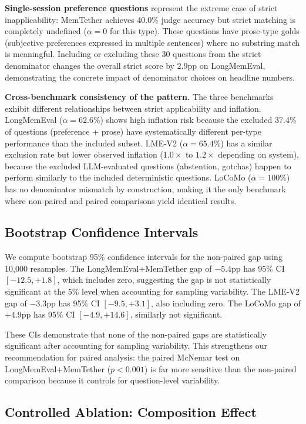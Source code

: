 \documentclass[10pt]{article}
\begin{document}
\textbf{Single-session preference questions} represent the extreme case of strict inapplicability: MemTether achieves 40.0\% judge accuracy but strict matching is completely undefined ($\alpha = 0$ for this type). These questions have prose-type golds (subjective preferences expressed in multiple sentences) where no substring match is meaningful. Including or excluding these 30 questions from the strict denominator changes the overall strict score by $2.9$pp on LongMemEval, demonstrating the concrete impact of denominator choices on headline numbers.

\textbf{Cross-benchmark consistency of the pattern.} The three benchmarks exhibit different relationships between strict applicability and inflation. LongMemEval ($\alpha = 62.6\%$) shows high inflation risk because the excluded 37.4\% of questions (preference + prose) have systematically different per-type performance than the included subset. LME-V2 ($\alpha = 65.4\%$) has a similar exclusion rate but lower observed inflation ($1.0\times$ to $1.2\times$ depending on system), because the excluded LLM-evaluated questions (abstention, gotchas) happen to perform similarly to the included deterministic questions. LoCoMo ($\alpha = 100\%$) has no denominator mismatch by construction, making it the only benchmark where non-paired and paired comparisons yield identical results.

\subsection{Bootstrap Confidence Intervals}
We compute bootstrap 95\% confidence intervals for the non-paired gap using 10{,}000 resamples. The LongMemEval+MemTether gap of $-5.4$pp has 95\% CI $[-12.5, +1.8]$, which includes zero, suggesting the gap is not statistically significant at the 5\% level when accounting for sampling variability. The LME-V2 gap of $-3.3$pp has 95\% CI $[-9.5, +3.1]$, also including zero. The LoCoMo gap of $+4.9$pp has 95\% CI $[-4.9, +14.6]$, similarly not significant.

These CIs demonstrate that none of the non-paired gaps are statistically significant after accounting for sampling variability. This strengthens our recommendation for paired analysis: the paired McNemar test on LongMemEval+MemTether ($p < 0.001$) is far more sensitive than the non-paired comparison because it controls for question-level variability.



\subsection{Controlled Ablation: Composition Effect}
\end{document}
